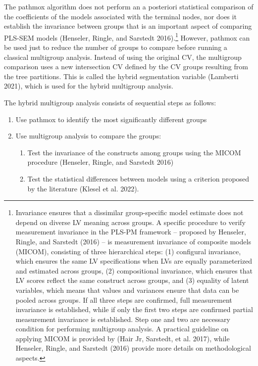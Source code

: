 The pathmox algorithm does not perform an a posteriori statistical
comparison of the coefficients of the models associated with the
terminal nodes, nor does it establish the invariance between groups that
is an important aspect of comparing PLS-SEM models (Henseler, Ringle, and Sarstedt 2016).\footnote{Invariance ensures that a dissimilar group-specific model estimate
  does not depend on diverse LV meaning across groups. A specific
  procedure to verify measurement invariance in the PLS-PM framework
  -- proposed by Henseler, Ringle, and Sarstedt (2016) -- is measurement invariance of composite
  models (MICOM), consisting of three hierarchical steps: (1)
  configural invariance, which ensures the same LV specifications when
  LVs are equally parameterized and estimated across groups, (2)
  compositional invariance, which ensures that LV scores reflect the
  same construct across groups, and (3) equality of latent variables,
  which means that values and variances ensure that data can be pooled
  across groups. If all three steps are confirmed, full measurement
  invariance is established, while if only the first two steps are
  confirmed partial measurement invariance is established. Step one
  and two are necessary condition for performing multigroup analysis.
  A practical guideline on applying MICOM is provided by (Hair Jr, Sarstedt, et al. 2017),
  while Henseler, Ringle, and Sarstedt (2016) provide more details on methodological aspects.}
However, pathmox can be used just to reduce the number of groups to
compare before running a classical multigroup analysis. Instead of using
the original CV, the multigroup comparison uses a new intersection CV
defined by the CV groups resulting from the tree partitions. This is
called the hybrid segmentation variable (Lamberti 2021), which is used for
the hybrid multigroup analysis.~

The hybrid multigroup analysis consists of sequential steps as follows:

\begin{enumerate}
\def\labelenumi{\arabic{enumi}.}
\item
  Use pathmox to identify the most significantly different groups
\item
  Use multigroup analysis to compare the groups:

  \begin{enumerate}
  \def\labelenumii{\arabic{enumii}.}
  \item
    Test the invariance of the constructs among groups using the
    MICOM procedure (Henseler, Ringle, and Sarstedt 2016)
  \item
    Test the statistical differences between models using a
    criterion proposed by the literature (Klesel et al. 2022).
  \end{enumerate}
\end{enumerate}

